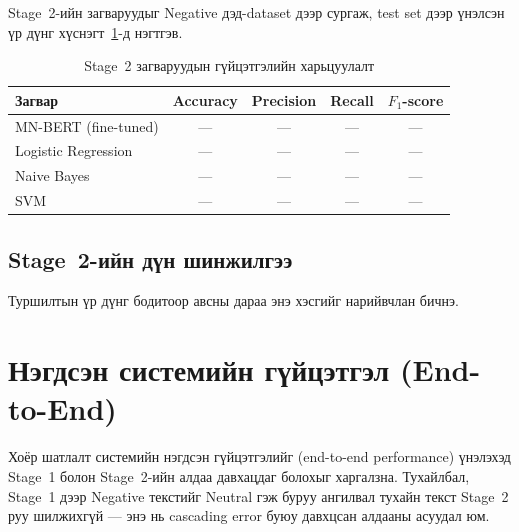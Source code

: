 Stage~2-ийн загваруудыг Negative дэд-dataset дээр сургаж, test set дээр үнэлсэн
үр дүнг хүснэгт~\ref{tab:stage2-results}-д нэгтгэв.

\begin{table}[H]
\centering
\caption{Stage~2 загваруудын гүйцэтгэлийн харьцуулалт}
\label{tab:stage2-results}
\begin{tabular}{@{}lcccc@{}}
\toprule
\textbf{Загвар} & \textbf{Accuracy} & \textbf{Precision} & \textbf{Recall} & \textbf{$F_1$-score} \\
\midrule
MN-BERT (fine-tuned) & --- & --- & --- & --- \\
Logistic Regression  & --- & --- & --- & --- \\
Naive Bayes          & --- & --- & --- & --- \\
SVM                  & --- & --- & --- & --- \\
\bottomrule
\end{tabular}
\end{table}


\subsection{Stage~2-ийн дүн шинжилгээ}


Туршилтын үр дүнг бодитоор авсны дараа энэ хэсгийг нарийвчлан бичнэ.

\section{Нэгдсэн системийн гүйцэтгэл (End-to-End)}

Хоёр шатлалт системийн нэгдсэн гүйцэтгэлийг (end-to-end performance) үнэлэхэд
Stage~1 болон Stage~2-ийн алдаа давхацдаг болохыг харгалзна. Тухайлбал, Stage~1
дээр Negative текстийг Neutral гэж буруу ангилвал тухайн текст Stage~2 руу
шилжихгүй --- энэ нь cascading error буюу давхцсан алдааны асуудал юм.


